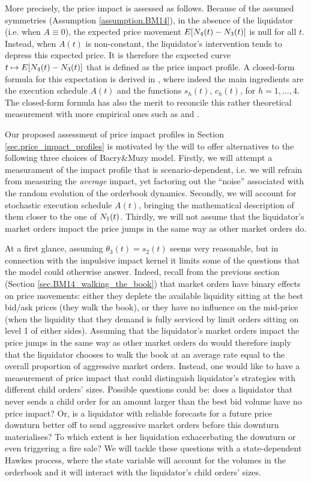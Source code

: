 \documentclass[10pt]{article}
\begin{document}
More precisely, the price impact is assessed as follows. Because of the assumed symmetries (Assumption \ref{assumption.BM14}), in the absence of the liquidator (i.e. when $A\equiv 0$), the expected price movement $\Expectation [\countingProc[4](t) - \countingProc[3](t)]$ is null for all $t$. Instead, when $A(t)$ is non-constant,  the liquidator's intervention tends to depress this expected price. It is therefore the expected curve $t\mapsto \Expectation[\countingProc[4](t)-\countingProc[3](t)]$ that is defined as the price impact profile. A closed-form formula for this expectation is derived in \citealp[Propositon 5.1 and Corollary 5.2]{BM14haw}, where indeed the main ingredients are the execution schedule $A(t)$ and the functions $s_h(t)$, $c_h(t)$, for $h=1,\dots,4$. The closed-form formula has also the merit to reconcile this rather theoretical measurement with more empirical ones such as \citealp{BN13mar} and  \citealp{MVMGFVLM09mar}.  

Our proposed assessment of price impact profiles in Section \ref{sec.price_impact_profiles} is motivated by the will to offer alternatives to the following three choices of Bacry\&Muzy model. Firstly, we will attempt a measurament of the impact profile that is scenario-dependent, i.e. we will refrain from measuring the \emph{average} impact, yet factoring out the ``noise'' associated with the random evolution of the orderbook dynamics. Secondly, we will account for stochastic execution schedule $A(t)$, bringing the mathematical description of them closer to the one of $\countingProc[1](t)$. Thirdly, we will not assume that the liquidator's market orders impact the price jumps in the same way as other market orders do.

At a first glance, assuming $\theta_3(t) = s_2(t)$ seems very reasonable, but in connection with the impulsive impact kernel it limits some of the questions that the model could otherwise answer. Indeed, recall from the previous section (Section \ref{sec.BM14_walking_the_book}) that market orders have binary effects on price movements: either they deplete the available liquidity sitting at the best bid/ask prices (they walk the book), or they have no influence on the mid-price (when the liquidity that they demand is fully serviced by limit orders sitting on level 1 of either sides). Assuming that the liquidator's market orders impact the price jumps in the same way as other market orders do would therefore imply that the liquidator chooses to walk the book at an average rate equal to the overall proportion of aggressive market orders. Instead, one would like to have a measurement of price impact that could distinguish liquidator's strategies with different child orders' sizes. Possible questions could be: does a liquidator that never sends a child order for an amount larger than the best bid volume have no price impact? Or, is a liquidator with reliable forecasts for a future price downturn better off to send aggressive market orders before this downturn materialises? To which extent is her liquidation exhacerbating the downturn or even triggering a fire sale? We will tackle these questions with a state-dependent Hawkes process, where the state variable will account for the volumes in the orderbook and it will interact with the liquidator's child orders' sizes. 
 
\end{document}
